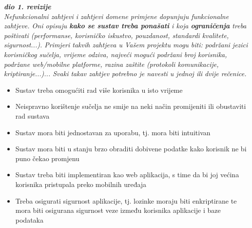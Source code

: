 			\textbf{\textit{dio 1. revizije}}\\
		 
			 \textit{Nefunkcionalni zahtjevi i zahtjevi domene primjene dopunjuju funkcionalne zahtjeve. Oni opisuju \textbf{kako se sustav treba ponašati} i koja \textbf{ograničenja} treba poštivati (performanse, korisničko iskustvo, pouzdanost, standardi kvalitete, sigurnost...). Primjeri takvih zahtjeva u Vašem projektu mogu biti: podržani jezici korisničkog sučelja, vrijeme odziva, najveći mogući podržani broj korisnika, podržane web/mobilne platforme, razina zaštite (protokoli komunikacije, kriptiranje...)... Svaki takav zahtjev potrebno je navesti u jednoj ili dvije rečenice.}
			 \begin{itemize}
			 	\item  Sustav treba omogućiti rad više korisnika u isto vrijeme
			 	\item  Neispravno korištenje sučelja ne smije na neki način promijeniti ili obustaviti rad sustava
			 	\item  Sustav mora biti jednostavan za uporabu, tj. mora biti intuitivan
			 	\item  Sustav mora biti u stanju brzo obraditi dobivene podatke kako korisnik ne bi puno čekao promjenu
			 	\item  Sustav treba biti implementiran kao web aplikacija, s time da bi joj većina korisnika pristupala preko mobilnih uređaja
			 	\item  Treba osigurati sigurnost aplikacije, tj. lozinke moraju biti enkriptirane te mora biti osigurana sigurnost veze između korisnika aplikacije i baze podataka 
			 \end{itemize}
			 
			 
	